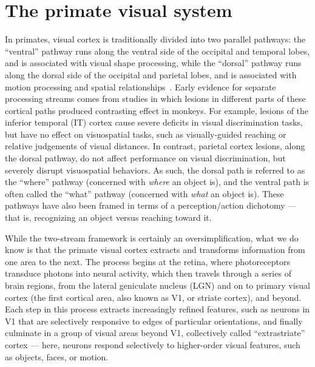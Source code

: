\section{The primate visual system}
In primates, visual cortex is traditionally divided into two parallel pathways: the ``ventral'' pathway runs along the ventral side of the occipital and temporal lobes, and is associated with visual shape processing, while the  ``dorsal'' pathway runs along the dorsal side of the occipital and parietal lobes, and is associated with motion processing and spatial relationships~\cite{Mishkin1982, Ungerleider1994WhatBrain, Felleman1991}. Early evidence for separate processing streams comes from studies in which lesions in different parts of these cortical paths produced contrasting effect in monkeys. For example, lesions of the inferior temporal (IT) cortex cause severe deficits in visual discrimination tasks, but have no effect on visuospatial tasks, such as visually-guided reaching or relative judgements of visual distances. In contrast, parietal cortex lesions, along the dorsal pathway, do not affect performance on visual discrimination, but severely disrupt visuospatial behaviors. As such, the dorsal path is referred to as the ``where'' pathway (concerned with \textit{where} an object is), and the ventral path is often called the ``what'' pathway (concerned with \textit{what} an object is)\cite{Ungerleider1994WhatBrain}. These pathways have also been framed in terms of a perception/action dichotomy --- that is, recognizing an object versus reaching toward it\cite{Goodale1992}.

While the two-stream framework is certainly an oversimplification, what we do know is that the primate visual cortex extracts and transforms information from one area to the next. The process begins at the retina, where photoreceptors transduce photons into neural activity, which then travels through a series of brain regions, from the lateral geniculate nucleus (LGN) and on to primary visual cortex (the first cortical area, also known as V1, or striate cortex), and beyond. Each step in this process extracts increasingly refined features, such as neurons in V1 that are selectively responsive to edges of particular orientations, and finally culminate in a group of visual areas beyond V1, collectively called ``extrastriate'' cortex --- here, neurons respond selectively to higher-order visual features, such as objects, faces, or motion\cite{Orban2008, DiCarlo2012}. 

